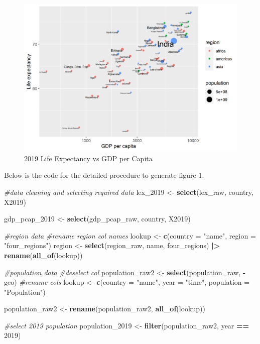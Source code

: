 \documentclass[
]{article}
\newenvironment{Shaded}{\begin{snugshade}}{\end{snugshade}}
\newcommand{\AttributeTok}[1]{\textcolor[rgb]{0.13,0.29,0.53}{#1}}
\newcommand{\CommentTok}[1]{\textcolor[rgb]{0.56,0.35,0.01}{\textit{#1}}}
\newcommand{\DecValTok}[1]{\textcolor[rgb]{0.00,0.00,0.81}{#1}}
\newcommand{\FunctionTok}[1]{\textcolor[rgb]{0.13,0.29,0.53}{\textbf{#1}}}
\newcommand{\NormalTok}[1]{#1}
\newcommand{\OtherTok}[1]{\textcolor[rgb]{0.56,0.35,0.01}{#1}}
\newcommand{\SpecialCharTok}[1]{\textcolor[rgb]{0.81,0.36,0.00}{\textbf{#1}}}
\newcommand{\StringTok}[1]{\textcolor[rgb]{0.31,0.60,0.02}{#1}}
\begin{document}
\begin{figure}
\centering
\includegraphics[width=11.8cm,height=\textheight]{lex_gdp_region_popu_2019.png}
\caption{2019 Life Expectancy vs GDP per Capita}
\end{figure}

Below is the code for the detailed procedure to generate figure 1.

\begin{Shaded}
\begin{Highlighting}[]
\CommentTok{\#data cleaning and selecting required data}
\NormalTok{lex\_2019 }\OtherTok{\textless{}{-}} \FunctionTok{select}\NormalTok{(lex\_raw, country, X2019)}

\NormalTok{gdp\_pcap\_2019 }\OtherTok{\textless{}{-}} \FunctionTok{select}\NormalTok{(gdp\_pcap\_raw, country, X2019)}

\CommentTok{\#region data}
\CommentTok{\#rename region col names}
\NormalTok{lookup }\OtherTok{\textless{}{-}} \FunctionTok{c}\NormalTok{(}\AttributeTok{country =} \StringTok{"name"}\NormalTok{,}
            \AttributeTok{region =} \StringTok{"four\_regions"}\NormalTok{)}
\NormalTok{region }\OtherTok{\textless{}{-}} \FunctionTok{select}\NormalTok{(region\_raw, name, four\_regions) }\SpecialCharTok{|\textgreater{}} \FunctionTok{rename}\NormalTok{(}\FunctionTok{all\_of}\NormalTok{(lookup))}


\CommentTok{\#population data}
\CommentTok{\#deselect col}
\NormalTok{population\_raw2 }\OtherTok{\textless{}{-}} \FunctionTok{select}\NormalTok{(population\_raw, }\SpecialCharTok{{-}}\NormalTok{geo)}
\CommentTok{\#rename cols}
\NormalTok{lookup }\OtherTok{\textless{}{-}} \FunctionTok{c}\NormalTok{(}\AttributeTok{country =} \StringTok{"name"}\NormalTok{,}
            \AttributeTok{year =} \StringTok{"time"}\NormalTok{,}
            \AttributeTok{population =} \StringTok{"Population"}\NormalTok{)}

\NormalTok{population\_raw2 }\OtherTok{\textless{}{-}} \FunctionTok{rename}\NormalTok{(population\_raw2, }\FunctionTok{all\_of}\NormalTok{(lookup))}

\CommentTok{\#select 2019 population}
\NormalTok{population\_2019 }\OtherTok{\textless{}{-}} \FunctionTok{filter}\NormalTok{(population\_raw2, year }\SpecialCharTok{==} \DecValTok{2019}\NormalTok{)}
\end{Highlighting}
\end{Shaded}
\end{document}
